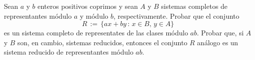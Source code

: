 \begin{ejerCongruencias}
	Sean $a$ y $b$ enteros positivos coprimos y sean $A$ y $B$ sistemas
	completos de representantes m\'odulo $a$ y m\'odulo $b$,
	respectivamente. Probar que el conjunto
	\begin{displaymath}
		R\,:=\,\big\{ax+by\,:\,x\in B,\,y\in A\big\}
	\end{displaymath}
	es un sistema completo de representates de las clases m\'odulo $ab$.
	Probar que, si $A$ y $B$ son, en cambio, sistemas reducidos,
	entonces el conjunto $R$ an\'alogo es un sistema reducido de
	representantes m\'odulo $ab$.
\end{ejerCongruencias}
